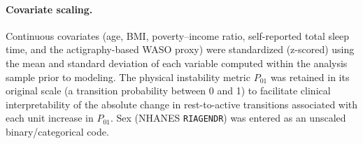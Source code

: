 \paragraph{Covariate scaling.}
Continuous covariates (age, BMI, poverty--income ratio, self-reported total sleep time, and the actigraphy-based WASO proxy) were standardized (z-scored) using the mean and standard deviation of each variable computed within the analysis sample prior to modeling.
The physical instability metric $P_{01}$ was retained in its original scale (a transition probability between 0 and 1) to facilitate clinical interpretability of the absolute change in rest-to-active transitions associated with each unit increase in $P_{01}$.
Sex (NHANES \texttt{RIAGENDR}) was entered as an unscaled binary/categorical code.
